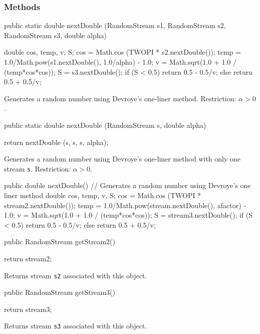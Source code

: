 \subsubsection* {Methods}

\begin{code}

   public static double nextDouble (RandomStream s1, RandomStream s2,
                                    RandomStream s3, double alpha) \begin{hide}  {
      double cos, temp, v, S;
      cos = Math.cos (TWOPI * s2.nextDouble());
      temp = 1.0/Math.pow(s1.nextDouble(), 1.0/alpha) - 1.0;
      v = Math.sqrt(1.0 + 1.0 / (temp*cos*cos));
      S = s3.nextDouble();
      if (S < 0.5)
         return 0.5 - 0.5/v;
      else
         return 0.5 + 0.5/v;
   }\end{hide}
\end{code}
  \begin{tabb} Generates a random number using Devroye's one-liner method.
   Restriction:  $\alpha > 0$.
  \end{tabb}
\begin{code}

   public static double nextDouble (RandomStream s, double alpha) \begin{hide}  {
      return nextDouble (s, s, s, alpha);
   }\end{hide}
\end{code}
  \begin{tabb} Generates a random number using Devroye's one-liner method with
  only one stream \texttt{s}.
  Restriction:  $\alpha > 0$.
  \end{tabb}
\begin{code}\begin{hide}

   public double nextDouble() {
      // Generates a random number using Devroye's one liner method
      double cos, temp, v, S;
      cos = Math.cos (TWOPI * stream2.nextDouble());
      temp = 1.0/Math.pow(stream.nextDouble(), afactor) - 1.0;
      v = Math.sqrt(1.0 + 1.0 / (temp*cos*cos));
      S = stream3.nextDouble();
      if (S < 0.5)
         return 0.5 - 0.5/v;
      else
         return 0.5 + 0.5/v;
  }\end{hide}

   public RandomStream getStream2()\begin{hide} {
      return stream2;
   }\end{hide}
\end{code}
\begin{tabb}   Returns stream \texttt{s2} associated with this object.
\end{tabb}
\begin{code}

   public RandomStream getStream3()\begin{hide} {
      return stream3;
   }\end{hide}
\end{code}
\begin{tabb}   Returns stream \texttt{s3} associated with this object.
\end{tabb}

\begin{code}\begin{hide}
}
\end{hide}
\end{code}
